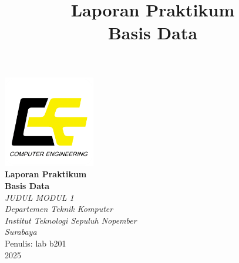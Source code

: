 \documentclass[a4paper,12pt]{report}
\title{Laporan Praktikum\\
Basis Data}
\author{}
\date{}
\begin{document}
\begin{titlepage}
    \centering

    \includegraphics[width=0.3\textwidth]{images/logo-tekkom.png}\\[1cm]

    {\Huge \textbf{Laporan Praktikum}\\[0.3cm]}
    {\Huge \textbf{Basis Data}}\\[1cm]
    
    {\Large \textit{JUDUL MODUL 1}}\\[3cm]
    
    {\large \textit{Departemen Teknik Komputer}}\\
    {\large \textit{Institut Teknologi Sepuluh Nopember}}\\
    {\large \textit{Surabaya}}\\[3cm]

    \hfill Penulis: lab b201\\
    \hfill 2025
\end{titlepage}

\tableofcontents
\clearpage











\end{document}
